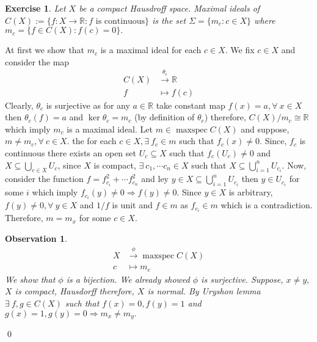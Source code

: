 \documentclass[11pt]{amsart}
\newtheorem{ex}[theorem]{Exercise}
\newtheorem*{Obs*}{Observation}
\newcommand{\RR}{\mathbb R}
\DeclareMathOperator{\mspec}{\text{maxspec}}
\begin{document}
\begin{ex}
Let $X$ be a compact Hausdroff space. Maximal ideals of $C(X):=\{f:X\to {\RR}:f\text{~is continuous}\}$ is the set $\Sigma=\{m_c:c\in X\}$ where $m_c=\{f\in C(X):f(c)=0\}.$
\end{ex}
\proof At first we show that $m_c$ is a maximal ideal for each $c\in X.$ We fix $c\in X$ and consider the map \begin{align*}
C(X)&\stackrel{\theta_c}{\longrightarrow} {\RR}\\
f&\mapsto f(c)
\end{align*}
Clearly, $\theta_c$ is surjective as for any $a\in {\RR}$ take constant map $f(x)=a,\forall~x\in X$ then $\theta_c(f)=a$ and $\ker \theta_c=m_c$ (by definition of $\theta_c$) therefore, $C(X)/m_c \cong {\RR}$ which imply $m_c$ is a maximal ideal. Let $m\in \mspec C(X)$ and suppose, $m\neq m_c,\forall~c\in X.$ the for each $c\in X, \exists~f_c\in m$ such that $f_c(x)\neq 0.$ Since, $f_c$ is continuous there exists an open set $U_c\subseteq X$ such that $f_c(U_c)\neq 0$ and $X\subseteq \displaystyle\bigcup_{c\in X} U_c$, since $X$ is compact, $\exists~c_1,\cdots c_n\in X$ such that $X\subseteq \displaystyle\bigcup_{i=1}^n U_{c_i}$. Now, consider the function $f=f_{c_i}^2+\cdots f_{c_n}^2$ and ley $y\in X\subseteq  \displaystyle\bigcup_{i=1}^n U_{c_i}$ then $y\in U_{c_i}$ for some $i$ which imply $f_{c_i}(y)\neq 0 \Rightarrow f(y)\neq 0$. Since $y\in X$ is arbitrary, $f(y)\neq 0,\forall~y\in X$ and $1/f$ is unit and $f\in m$ as $f_{c_i}\in m$ which is a contradiction. Therefore, $m=m_x$ for some $c\in X.$
\begin{Obs*}
\begin{align*}
X&\stackrel{\phi}{\longrightarrow} \mspec C(X)\\
c&\mapsto m_c
\end{align*}
We show that $\phi$ is a bijection. We already showed $\phi$ is surjective. Suppose, $x\neq y,$ $X$ is compact, Hausdorff therefore, $X$ is normal. By Uryshon lemma $\exists~f,g\in C(X)$ such that $f(x)=0,f(y)=1$ and $g(x)=1,g(y)=0 \Rightarrow m_x\neq m_y.$
\end{Obs*}\qed
\end{document}

